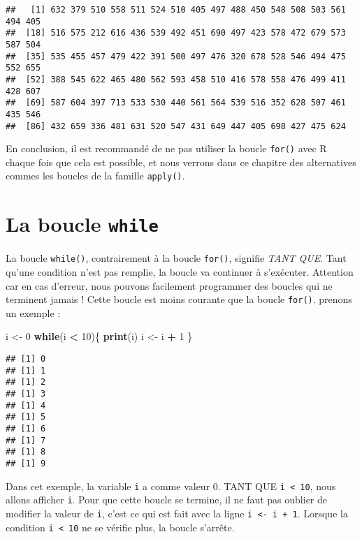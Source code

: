 \documentclass[]{book}
\newenvironment{Shaded}{\begin{snugshade}}{\end{snugshade}}
\newcommand{\KeywordTok}[1]{\textcolor[rgb]{0.13,0.29,0.53}{\textbf{#1}}}
\newcommand{\DecValTok}[1]{\textcolor[rgb]{0.00,0.00,0.81}{#1}}
\newcommand{\StringTok}[1]{\textcolor[rgb]{0.31,0.60,0.02}{#1}}
\newcommand{\ControlFlowTok}[1]{\textcolor[rgb]{0.13,0.29,0.53}{\textbf{#1}}}
\newcommand{\OperatorTok}[1]{\textcolor[rgb]{0.81,0.36,0.00}{\textbf{#1}}}
\newcommand{\NormalTok}[1]{#1}
\theoremstyle{definition}
\theoremstyle{definition}
\theoremstyle{definition}
\theoremstyle{remark}
\begin{document}
\begin{verbatim}
##   [1] 632 379 510 558 511 524 510 405 497 488 450 548 508 503 561 494 405
##  [18] 516 575 212 616 436 539 492 451 690 497 423 578 472 679 573 587 504
##  [35] 535 455 457 479 422 391 500 497 476 320 678 528 546 494 475 552 655
##  [52] 388 545 622 465 480 562 593 458 510 416 578 558 476 499 411 428 607
##  [69] 587 604 397 713 533 530 440 561 564 539 516 352 628 507 461 435 546
##  [86] 432 659 336 481 631 520 547 431 649 447 405 698 427 475 624
\end{verbatim}

En conclusion, il est recommandé de ne pas utiliser la boucle
\texttt{for()} avec R chaque fois que cela est possible, et nous verrons
dans ce chapitre des alternatives commes les boucles de la famille
\texttt{apply()}.

\hypertarget{l17while}{\section{\texorpdfstring{La boucle
\texttt{while}}{La boucle while}}\label{l17while}}

La boucle \texttt{while()}, contrairement à la boucle \texttt{for()},
signifie \emph{TANT QUE}. Tant qu'une condition n'est pas remplie, la
boucle va continuer à s'exécuter. Attention car en cas d'erreur, nous
pouvons facilement programmer des boucles qui ne terminent jamais !
Cette boucle est moins courante que la boucle \texttt{for()}. prenons un
exemple :

\begin{Shaded}
\begin{Highlighting}[]
\NormalTok{i <-}\StringTok{ }\DecValTok{0}
\ControlFlowTok{while}\NormalTok{(i }\OperatorTok{<}\StringTok{ }\DecValTok{10}\NormalTok{)\{}
  \KeywordTok{print}\NormalTok{(i)}
\NormalTok{  i <-}\StringTok{ }\NormalTok{i }\OperatorTok{+}\StringTok{ }\DecValTok{1}
\NormalTok{\}}
\end{Highlighting}
\end{Shaded}

\begin{verbatim}
## [1] 0
## [1] 1
## [1] 2
## [1] 3
## [1] 4
## [1] 5
## [1] 6
## [1] 7
## [1] 8
## [1] 9
\end{verbatim}

Dans cet exemple, la variable \texttt{i} a comme valeur 0. TANT QUE
\texttt{i\ \textless{}\ 10}, nous allons afficher \texttt{i}. Pour que
cette boucle se termine, il ne faut pas oublier de modifier la valeur de
\texttt{i}, c'est ce qui est fait avec la ligne
\texttt{i\ \textless{}-\ i\ +\ 1}. Lorsque la condition
\texttt{i\ \textless{}\ 10} ne se vérifie plus, la boucle s'arrête.
\end{document}
